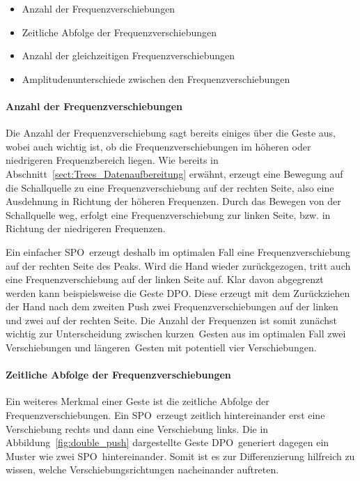 \begin{itemize} 
\item Anzahl der Frequenzverschiebungen
\item Zeitliche Abfolge der Frequenzverschiebungen
\item Anzahl der gleichzeitigen Frequenzverschiebungen
\item Amplitudenunterschiede zwischen den Frequenzverschiebungen
\end{itemize}

\paragraph*{Anzahl der Frequenzverschiebungen}
Die Anzahl der Frequenzverschiebung sagt bereits einiges über die Geste aus, wobei auch wichtig ist, ob die Frequenzverschiebungen im höheren oder niedrigeren Frequenzbereich liegen. Wie bereits in Abschnitt~\ref{sect:Trees_Datenaufbereitung} erwähnt, erzeugt eine Bewegung auf die Schallquelle zu eine Frequenzverschiebung auf der rechten Seite, also eine Ausdehnung in Richtung der höheren Frequenzen. Durch das Bewegen von der Schallquelle weg, erfolgt eine Frequenzverschiebung zur linken Seite, bzw. in Richtung der niedrigeren Frequenzen. 

Ein einfacher \glqq \acl{SPO}\grqq\ erzeugt deshalb im optimalen Fall eine Frequenzverschiebung auf der rechten Seite des Peaks. Wird die Hand wieder zurückgezogen, tritt auch eine Frequenzverschiebung auf der linken Seite auf. Klar davon abgegrenzt werden kann beispielsweise die Geste \glqq \acl{DPO}\grqq . Diese erzeugt mit dem Zurückziehen der Hand nach dem zweiten Push zwei Frequenzverschiebungen auf der linken und zwei auf der rechten Seite. Die Anzahl der Frequenzen ist somit zunächst wichtig zur Unterscheidung zwischen \glqq kurzen\grqq\ Gesten aus im optimalen Fall zwei Verschiebungen und \glqq längeren\grqq\ Gesten mit potentiell vier Verschiebungen. 

\paragraph*{Zeitliche Abfolge der Frequenzverschiebungen}
Ein weiteres Merkmal einer Geste ist die zeitliche Abfolge der Frequenzverschiebungen. Ein \glqq \acl{SPO}\grqq\ erzeugt zeitlich hintereinander erst eine Verschiebung rechts und dann eine Verschiebung links. Die in Abbildung~\ref{fig:double_push} dargestellte Geste \glqq \acl{DPO}\grqq\ generiert dagegen ein Muster wie zwei \glqq \acl{SPO}\grqq\ hintereinander. Somit ist es zur Differenzierung hilfreich zu wissen, welche Verschiebungsrichtungen nacheinander auftreten.


